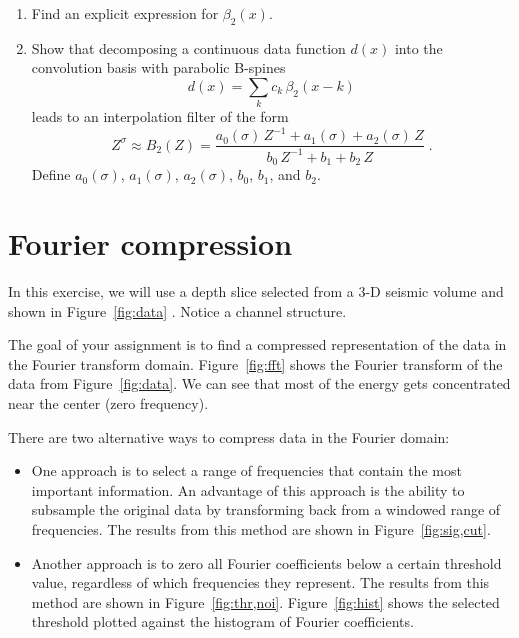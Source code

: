 \begin{enumerate}
\begin{enumerate}
\item Find an explicit expression for $\beta_2(x)$.
\item Show that decomposing a continuous data function $d(x)$ into the convolution basis 
  with parabolic B-spines
  \begin{equation}
    \label{eq:basis} 
    d(x) = \sum\limits_k c_k\,\beta_2(x-k)
  \end{equation}
  leads to an interpolation filter of the form
  \begin{equation}
    \label{eq:bz}
    Z^{\sigma} \approx B_2(Z) = \frac{a_0(\sigma)\,Z^{-1} + a_1(\sigma) + a_2(\sigma)\,Z}{b_0\,Z^{-1} + b_1 + b_2\,Z}\;.
  \end{equation}
  Define $a_0(\sigma)$, $a_1(\sigma)$, $a_2(\sigma)$, $b_0$, $b_1$, and $b_2$.
\end{enumerate}
\end{enumerate}

\section{Fourier compression}

In this exercise, we will use a depth slice selected from a 3-D
seismic volume and shown in Figure~\ref{fig:data} \cite[]{hall}. Notice
a channel structure.



The goal of your assignment is to find a compressed representation of
the data in the Fourier transform domain. Figure~\ref{fig:fft} shows
the Fourier transform of the data from Figure~\ref{fig:data}. We can
see that most of the energy gets concentrated near the center (zero
frequency).

There are two alternative ways to compress data in the Fourier domain:
\begin{itemize}
\item One approach is to
select a range of frequencies that contain the most important
information. An advantage of this approach is the ability to subsample
the original data by transforming back from a windowed range of frequencies.
The results from this method are shown in Figure~\ref{fig:sig,cut}.
\item Another approach is to zero all Fourier coefficients below a certain threshold value, regardless of which frequencies they represent.  
 The results from this method are shown in Figure~\ref{fig:thr,noi}. 
Figure~\ref{fig:hist} shows the selected threshold plotted against the histogram of Fourier coefficients.
\end{itemize}


